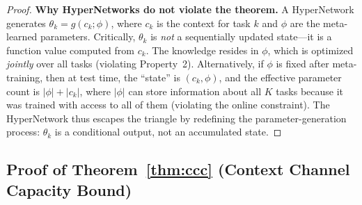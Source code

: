 \documentclass{article}
\begin{document}
\begin{proof}
\textbf{Why HyperNetworks do not violate the theorem.}
A HyperNetwork generates $\theta_k = g(c_k; \phi)$, where $c_k$ is the context for task $k$ and $\phi$ are the meta-learned parameters. Critically, $\theta_k$ is \emph{not} a sequentially updated state---it is a function value computed from $c_k$. The knowledge resides in $\phi$, which is optimized \emph{jointly} over all tasks (violating Property~2). Alternatively, if $\phi$ is fixed after meta-training, then at test time, the ``state'' is $(c_k, \phi)$, and the effective parameter count is $|\phi| + |c_k|$, where $|\phi|$ can store information about all $K$ tasks because it was trained with access to all of them (violating the online constraint). The HyperNetwork thus escapes the triangle by redefining the parameter-generation process: $\theta_k$ is a conditional output, not an accumulated state.
\end{proof}


\subsection{Proof of Theorem~\ref{thm:ccc} (Context Channel Capacity Bound)}
\label{app:proof_ccc}
\end{document}

